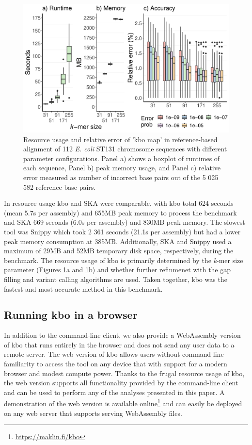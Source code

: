 \documentclass[unnumsec,webpdf,contemporary,large]{oup-authoring-template}%
\theoremstyle{thmstyleone}%
\theoremstyle{thmstyletwo}%
\theoremstyle{thmstylethree}%
\newcommand{\kbo}{{\sf kbo}}
\begin{document}
\begin{figure}
    \centering
    \includegraphics[width=1.0\linewidth]{map_parameter_comparison.pdf}
    \caption{Resource usage and relative error of 'kbo map' in reference-based alignment of 112 \textit{E. coli} ST131 chromosome sequences with different parameter configurations. Panel a) shows a boxplot of runtimes of each sequence, Panel b) peak memory usage, and Panel c) relative error measured as number of incorrect base pairs out of the 5 025 582 reference base pairs.}
    \label{fig:map-by-kmer-size}
\end{figure}


In resource usage {\sf kbo} and SKA were comparable, with {\sf kbo} total 624 seconds (mean 5.7s per assembly) and 655MB peak memory to process the benchmark and SKA 669 seconds (6.0s per assembly) and 830MB peak memory. The slowest tool was Snippy which took 2 361 seconds (21.1s per assembly) but had a lower peak memory consumption at 385MB. Additionally, SKA and Snippy used a maximum of 29MB and 52MB temporary disk space, respectively, during the benchmark. The resource usage of {\sf kbo} is primarily determined by the \emph{k}-mer size parameter (Figures \ref{fig:map-by-kmer-size}a and \ref{fig:map-by-kmer-size}b) and whether further refinmenet with the gap filling and variant calling algorithms are used. Taken together, {\sf kbo} was the fastest and most accurate method in this benchmark.

\subsection{Running {\kbo} in a browser}
In addition to the command-line client, we also provide a WebAssembly version of {\sf kbo} that runs entirely in the browser and does not send any user data to a remote server. The web version of {\sf kbo} allows users without command-line familiarity to access the tool on any device that with support for a modern browser and modest compute power. Thanks to the frugal resource usage of {\sf kbo}, the web version supports all functionality provided by the command-line client and can be used to perform any of the analyses presented in this paper. A demonstration of the web version is available online\footnote{\url{https://maklin.fi/kbo}} and can easily be deployed on any web server that supports serving WebAssembly files.
\end{document}
